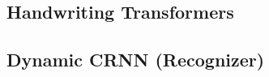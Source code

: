 \documentclass[10pt,twocolumn,letterpaper]{article}
\begin{document}
\subsection{Handwriting Transformers\cite{HWT}}
\label{subsec: HWT}



\subsection{Dynamic CRNN (Recognizer)\cite{crnn}}
\label{subsec: CRNN}
\end{document}
